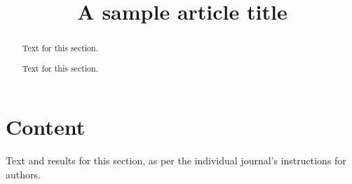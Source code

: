 \documentclass{bmcart}
\begin{document}
\begin{frontmatter}

\begin{fmbox}



\title{A sample article title}



\author[
   addressref={aff1},                   corref={aff1},                       noteref={n1},                        email={jane.e.doe@cambridge.co.uk}   ]{ }
\author[
   addressref={aff1,aff2},
   email={john.RS.Smith@cambridge.co.uk}
]{ }



\address[id=aff1]{, ,                     ,                                                                  }
\address[id=aff2]{,
  ,
  ,
}



\begin{artnotes}
 \end{artnotes}

\end{fmbox}



\begin{abstractbox}

\begin{abstract}  Text for this section.

 Text for this section.
\end{abstract}



\begin{keyword}
\end{keyword}



\end{abstractbox}


\end{frontmatter}





\section*{Content}
Text and results for this section, as per the individual journal's instructions for authors. 
\end{document}
